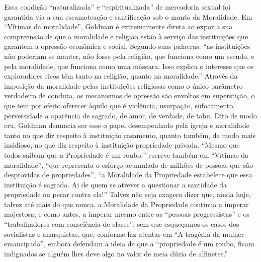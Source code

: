 Essa condição ``naturalizada'' e ``espiritualizada'' de mercadoria
sexual foi garantida via a sua escamoteação e santificação sob o manto
da Moralidade. Em ``Vítimas da moralidade'', Goldman é extremamente
direta ao expor a sua compreensão de que a moralidade e religião estão à
serviço das instituições que garantem a opressão econômica e social.
Segundo suas palavras: ``as instituições não poderiam se manter, não
fosse pela religião, que funciona como um escudo, e pela moralidade, que
funciona como uma máscara. Isso explica o interesse que os exploradores
ricos têm tanto na religião, quanto na moralidade.'' Através da
imposição da moralidade pelas instituições religiosas como o único
parâmetro verdadeiro de conduta, os mecanismos de opressão são envoltos
em superstição, o que tem por efeito oferecer àquilo que é violência,
usurpação, sufocamento, perversidade a aparência de sagrado, de amor, de
verdade, de tabu. Dito de modo cru, Goldman denuncia ser esse o papel
desempenhado pela igreja e moralidade tanto no que diz respeito à
instituição casamento, quanto também, de modo mais insidioso, no que diz
respeito à instituição propriedade privada. ``Mesmo que todos saibam que
a Propriedade é um roubo;'' escreve também em ``Vítimas da moralidade'',
``que representa o esforço acumulado de milhões de pessoas que são
desprovidas de propriedades'', ``a Moralidade da Propriedade estabelece
que essa instituição é sagrada. Ai de quem se atrever a questionar a
santidade da propriedade ou pecar contra ela!'' Talvez não seja exagero
dizer que, ainda hoje, talvez até mais do que nunca, a Moralidade da
Propriedade continua a imperar majestosa; e como antes, a imperar mesmo
entre as ``pessoas progressistas'' e os ``trabalhadores com consciência
de classe''; sem que esqueçamos os casos dos socialistas e anarquistas,
que, conforme faz atentar em ``A tragédia da mulher emancipada'', embora
defendam a ideia de que a ``propriedade é um roubo, ficam indignados se
alguém lhes deve algo no valor de meia dúzia de alfinetes.''

